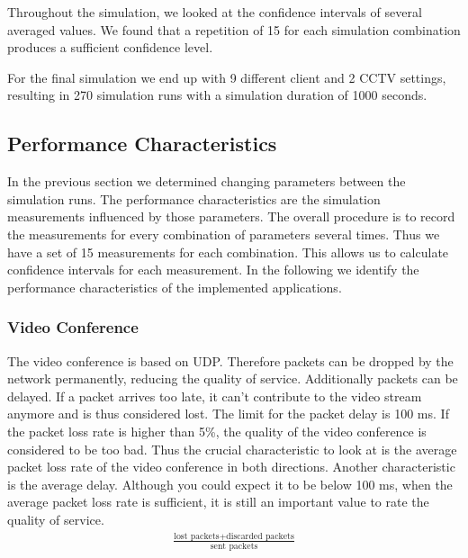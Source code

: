 \documentclass[
10pt, %
a4paper, %
oneside, %
headinclude,footinclude, %
BCOR5mm, %
]{scrartcl}
\begin{document}
Throughout the simulation, we looked at the confidence intervals of several averaged values. We found that a repetition of 15 for each simulation combination produces a sufficient confidence level.

For the final simulation we end up with 9 different client and 2 CCTV settings, resulting in 270 simulation runs with a simulation duration of 1000 seconds.

\subsection{Performance Characteristics} \label{performance_characteristics}
In the previous section we determined changing parameters between the simulation runs. The performance characteristics are the simulation measurements influenced by those parameters. The overall procedure is to record the measurements for every combination of parameters several times. Thus we have a set of 15 measurements for each combination. This allows us to calculate confidence intervals for each measurement. In the following we identify the performance characteristics of the implemented applications.

\subsubsection{Video Conference}
The video conference is based on UDP. Therefore packets can be dropped by the network permanently, reducing the quality of service. Additionally packets can be delayed. If a packet arrives too late, it can't contribute to the video stream anymore and is thus considered lost. The limit for the packet delay is 100 ms. If the packet loss rate is higher than 5\%, the quality of the video conference is considered to be too bad. Thus the crucial characteristic to look at is the average packet loss rate of the video conference in both directions.
Another characteristic is the average delay. Although you could expect it to be below 100 ms, when the average packet loss rate is sufficient, it is still an important value to rate the quality of service.
\begin{align*}
\frac{\text{lost packets} + \text{discarded packets}}{\text{sent packets}}
\end{align*}
\end{document}
